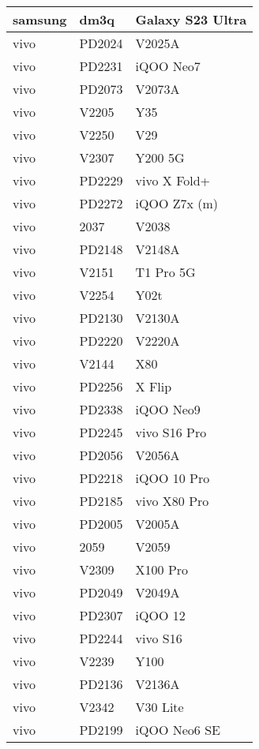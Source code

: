 \begin{tabularx}{\linewidth}{|l|X|X|}
        samsung & dm3q & Galaxy S23 Ultra \\ \hline
        vivo & PD2024 & V2025A \\ \hline
        vivo & PD2231 & iQOO Neo7 \\ \hline
        vivo & PD2073 & V2073A \\ \hline
        vivo & V2205 & Y35 \\ \hline
        vivo & V2250 & V29 \\ \hline
        vivo & V2307 & Y200 5G \\ \hline
        vivo & PD2229 & vivo X Fold+ \\ \hline
        vivo & PD2272 & iQOO Z7x (m) \\ \hline
        vivo & 2037 & V2038 \\ \hline
        vivo & PD2148 & V2148A \\ \hline
        vivo & V2151 & T1 Pro 5G \\ \hline
        vivo & V2254 & Y02t \\ \hline
        vivo & PD2130 & V2130A \\ \hline
        vivo & PD2220 & V2220A \\ \hline
        vivo & V2144 & X80 \\ \hline
        vivo & PD2256 & X Flip \\ \hline
        vivo & PD2338 & iQOO Neo9 \\ \hline
        vivo & PD2245 & vivo S16 Pro \\ \hline
        vivo & PD2056 & V2056A \\ \hline
        vivo & PD2218 & iQOO 10 Pro \\ \hline
        vivo & PD2185 & vivo X80 Pro \\ \hline
        vivo & PD2005 & V2005A \\ \hline
        vivo & 2059 & V2059 \\ \hline
        vivo & V2309 & X100 Pro \\ \hline
        vivo & PD2049 & V2049A \\ \hline
        vivo & PD2307 & iQOO 12 \\ \hline
        vivo & PD2244 & vivo S16 \\ \hline
        vivo & V2239 & Y100 \\ \hline
        vivo & PD2136 & V2136A \\ \hline
        vivo & V2342 & V30 Lite \\ \hline
        vivo & PD2199 & iQOO Neo6 SE \\ \hline

\end{tabularx}
